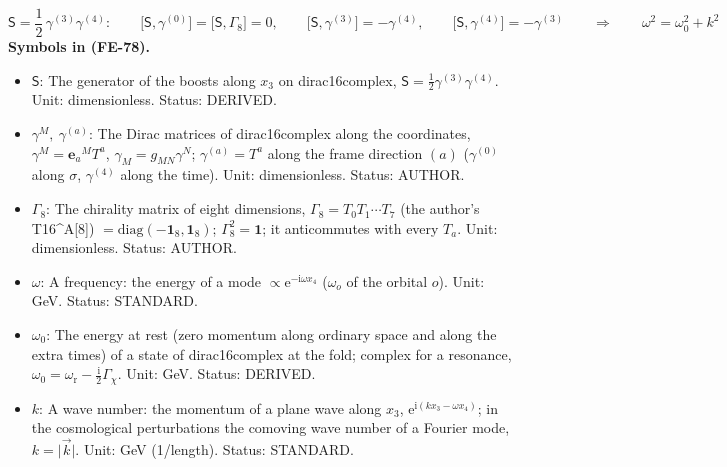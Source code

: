 \documentclass[
  10pt,
]{article}
\providecommand{\tightlist}{%
  \setlength{\itemsep}{0pt}\setlength{\parskip}{0pt}}
\begin{document}
\[
\mathsf{S} = \frac12\,\gamma^{(3)}\gamma^{(4)}:\qquad
\big[\mathsf{S}, \gamma^{(0)}\big] = \big[\mathsf{S}, \Gamma_8\big] = 0,\qquad
\big[\mathsf{S}, \gamma^{(3)}\big] = -\gamma^{(4)},\qquad \big[\mathsf{S}, \gamma^{(4)}\big] = -\gamma^{(3)}\qquad\Rightarrow\qquad
\omega^2 = \omega_0^2 + k^2 \tag{FE-78}
\] \textbf{Symbols in (FE-78).}

\begin{itemize}
\tightlist
\item
  \(\mathsf{S}\): The generator of the boosts along \(x_3\) on
  dirac16complex, \(\mathsf{S} = \frac12\gamma^{(3)}\gamma^{(4)}\).
  Unit: dimensionless. Status: DERIVED.
\item
  \(\gamma^M,\ \gamma^{(a)}\): The Dirac matrices of dirac16complex
  along the coordinates, \(\gamma^M = \mathbf{e}_a{}^MT^a\),
  \(\gamma_M = g_{MN}\gamma^N\); \(\gamma^{(a)} = T^a\) along the frame
  direction \((a)\) (\(\gamma^{(0)}\) along \(\sigma\), \(\gamma^{(4)}\)
  along the time). Unit: dimensionless. Status: AUTHOR.
\item
  \(\Gamma_8\): The chirality matrix of eight dimensions,
  \(\Gamma_8 = T_0T_1\cdots T_7\) (the author's T16\^{}A{[}8{]})
  \(= \mathrm{diag}(-\mathbf{1}_8, \mathbf{1}_8)\);
  \(\Gamma_8^2 = \mathbf{1}\); it anticommutes with every \(T_a\). Unit:
  dimensionless. Status: AUTHOR.
\item
  \(\omega\): A frequency: the energy of a mode
  \(\propto \mathrm{e}^{-\mathrm{i}\omega x_4}\) (\(\omega_o\) of the
  orbital \(o\)). Unit: GeV. Status: STANDARD.
\item
  \(\omega_0\): The energy at rest (zero momentum along ordinary space
  and along the extra times) of a state of dirac16complex at the fold;
  complex for a resonance,
  \(\omega_0 = \omega_{\mathrm{r}} - \frac{\mathrm{i}}{2}\Gamma_\chi\).
  Unit: GeV. Status: DERIVED.
\item
  \(k\): A wave number: the momentum of a plane wave along \(x_3\),
  \(\mathrm{e}^{\mathrm{i}(kx_3 - \omega x_4)}\); in the cosmological
  perturbations the comoving wave number of a Fourier mode,
  \(k = \lvert\vec k\rvert\). Unit: GeV (1/length). Status: STANDARD.
\end{itemize}
\end{document}
